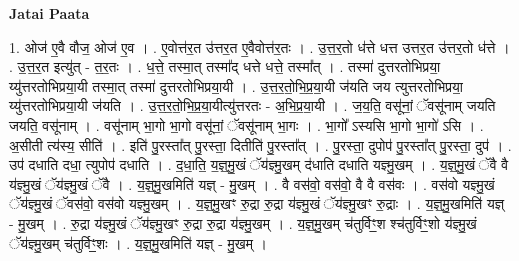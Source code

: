 \documentclass[17pt]{extarticle}
\begin{document}
\textbf{Jatai Paata} \newline

1. ओज॑ ए॒वै वौज॒ ओज॑ ए॒व । . ए॒वोत्त॑र॒त उ॑त्तर॒त ए॒वैवोत्त॑र॒तः । . उ॒त्त॒र॒तो ध॑त्ते धत्त उत्तर॒त उ॑त्तर॒तो ध॑त्ते । . उ॒त्त॒र॒त इत्यु॑त् - त॒र॒तः । . ध॒त्ते॒ तस्मा॒त् तस्मा᳚द् धत्ते धत्ते॒ तस्मा᳚त् । . तस्मा॑ दुत्तरतोभिप्रया॒ य्यु॑त्तरतोभिप्रया॒यी तस्मा॒त् तस्मा॑ दुत्तरतोभिप्रया॒यी । . उ॒त्त॒र॒तो॒भि॒प्र॒या॒यी ज॑यति जय त्युत्तरतोभिप्रया॒ य्यु॑त्तरतोभिप्रया॒यी ज॑यति । . उ॒त्त॒र॒तो॒भि॒प्र॒या॒यीत्यु॑त्तरतः - अ॒भि॒प्र॒या॒यी । . ज॒य॒ति॒ वसू॑नां॒ ॅवसू॑नाम् जयति जयति॒ वसू॑नाम् । . वसू॑नाम् भा॒गो भा॒गो वसू॑नां॒ ॅवसू॑नाम् भा॒गः । . भा॒गो᳚ ऽस्यसि भा॒गो भा॒गो॑ ऽसि । . अ॒सीती त्य॑स्य॒ सीति॑ । . इति॑ पु॒रस्ता᳚त् पु॒रस्ता॒ दितीति॑ पु॒रस्ता᳚त् । . पु॒रस्ता॒ दुपोप॑ पु॒रस्ता᳚त् पु॒रस्ता॒ दुप॑ । . उप॑ दधाति दधा॒ त्युपोप॑ दधाति । . द॒धा॒ति॒ य॒ज्ञ्॒मु॒खं ॅय॑ज्ञ्मु॒खम् द॑धाति दधाति यज्ञ्मु॒खम् । . य॒ज्ञ्॒मु॒खं ॅवै वै य॑ज्ञ्मु॒खं ॅय॑ज्ञ्मु॒खं ॅवै । . य॒ज्ञ्॒मु॒खमिति॑ यज्ञ् - मु॒खम् । . वै वस॑वो॒ वस॑वो॒ वै वै वस॑वः । . वस॑वो यज्ञ्मु॒खं ॅय॑ज्ञ्मु॒खं ॅवस॑वो॒ वस॑वो यज्ञ्मु॒खम् । . य॒ज्ञ्॒मु॒खꣳ रु॒द्रा रु॒द्रा य॑ज्ञ्मु॒खं ॅय॑ज्ञ्मु॒खꣳ रु॒द्राः । . य॒ज्ञ्॒मु॒खमिति॑ यज्ञ् - मु॒खम् । . रु॒द्रा य॑ज्ञ्मु॒खं ॅय॑ज्ञ्मु॒खꣳ रु॒द्रा रु॒द्रा य॑ज्ञ्मु॒खम् । . य॒ज्ञ्॒मु॒खम् च॑तुर्विꣳ॒॒श श्च॑तुर्विꣳ॒॒शो य॑ज्ञ्मु॒खं ॅय॑ज्ञ्मु॒खम् च॑तुर्विꣳ॒॒शः । . य॒ज्ञ्॒मु॒खमिति॑ यज्ञ् - मु॒खम् । \newline
\end{document}
